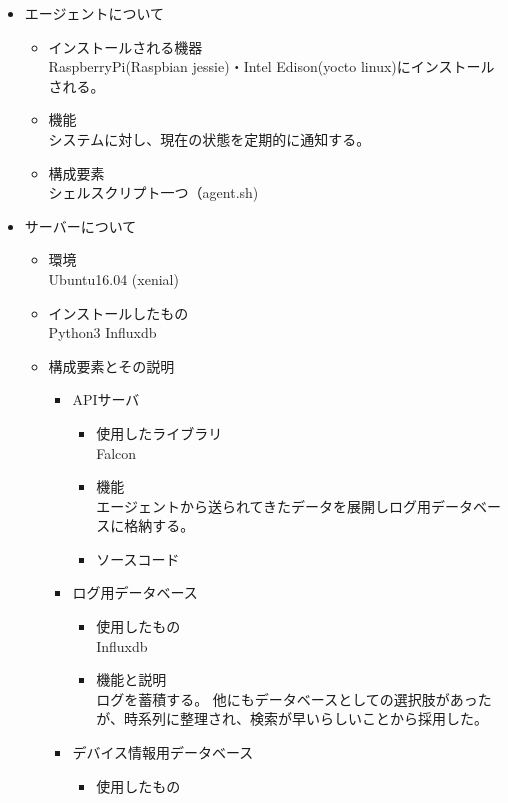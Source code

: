 \begin{itemize}
	\item エージェントについて
		\begin{itemize}
			\item インストールされる機器\\
				RaspberryPi(Raspbian jessie)・Intel Edison(yocto linux)にインストールされる。
			\item 機能\\
				システムに対し、現在の状態を定期的に通知する。
			\item 構成要素\\
				シェルスクリプト一つ（agent.sh)
		\end{itemize}
	\item サーバーについて
		\begin{itemize}
			\item 環境\\
				Ubuntu16.04 (xenial)
			\item インストールしたもの\\
				Python3 Influxdb
			\item 構成要素とその説明
				\begin{itemize}
					\item APIサーバ
						\begin{itemize}
							\item 使用したライブラリ\\
								Falcon
							\item 機能\\
								エージェントから送られてきたデータを展開しログ用データベースに格納する。
							\item ソースコード\\
						\end{itemize}
					\item ログ用データベース
						\begin{itemize}
							\item 使用したもの\\
								Influxdb
							\item 機能と説明\\
								ログを蓄積する。
								他にもデータベースとしての選択肢があったが、時系列に整理され、検索が早いらしいことから採用した。
						\end{itemize}
					\item デバイス情報用データベース
						\begin{itemize}
							\item 使用したもの\\

\end{itemize}
\end{itemize}
\end{itemize}
\end{itemize}
